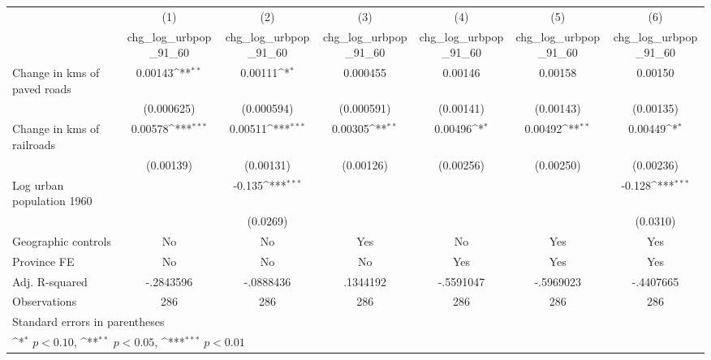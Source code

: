 {
\def\sym#1{\ifmmode^{#1}\else\(^{#1}\)\fi}
\begin{tabular}{l*{6}{c}}
\hline\hline
                    &\multicolumn{1}{c}{(1)}&\multicolumn{1}{c}{(2)}&\multicolumn{1}{c}{(3)}&\multicolumn{1}{c}{(4)}&\multicolumn{1}{c}{(5)}&\multicolumn{1}{c}{(6)}\\
                    &\multicolumn{1}{c}{chg\_log\_urbpop\_91\_60}&\multicolumn{1}{c}{chg\_log\_urbpop\_91\_60}&\multicolumn{1}{c}{chg\_log\_urbpop\_91\_60}&\multicolumn{1}{c}{chg\_log\_urbpop\_91\_60}&\multicolumn{1}{c}{chg\_log\_urbpop\_91\_60}&\multicolumn{1}{c}{chg\_log\_urbpop\_91\_60}\\
\hline
Change in kms of paved roads&     0.00143\sym{**} &     0.00111\sym{*}  &    0.000455         &     0.00146         &     0.00158         &     0.00150         \\
                    &  (0.000625)         &  (0.000594)         &  (0.000591)         &   (0.00141)         &   (0.00143)         &   (0.00135)         \\
[1em]
Change in kms of railroads&     0.00578\sym{***}&     0.00511\sym{***}&     0.00305\sym{**} &     0.00496\sym{*}  &     0.00492\sym{**} &     0.00449\sym{*}  \\
                    &   (0.00139)         &   (0.00131)         &   (0.00126)         &   (0.00256)         &   (0.00250)         &   (0.00236)         \\
[1em]
Log urban population 1960&                     &      -0.135\sym{***}&                     &                     &                     &      -0.128\sym{***}\\
                    &                     &    (0.0269)         &                     &                     &                     &    (0.0310)         \\
\hline
Geographic controls &          No         &          No         &         Yes         &          No         &         Yes         &         Yes         \\
Province FE         &          No         &          No         &          No         &         Yes         &         Yes         &         Yes         \\
Adj. R-squared      &   -.2843596         &   -.0888436         &    .1344192         &   -.5591047         &   -.5969023         &   -.4407665         \\
Observations        &         286         &         286         &         286         &         286         &         286         &         286         \\
\hline\hline
\multicolumn{7}{l}{\footnotesize Standard errors in parentheses}\\
\multicolumn{7}{l}{\footnotesize \sym{*} \(p<0.10\), \sym{**} \(p<0.05\), \sym{***} \(p<0.01\)}\\
\end{tabular}
}
